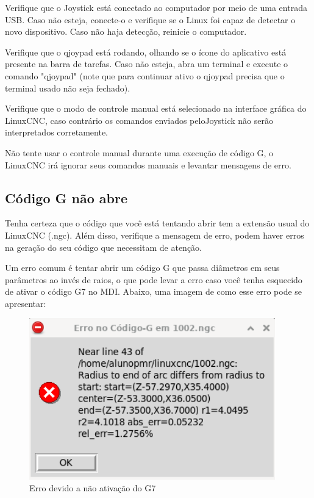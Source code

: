 \documentclass[twoside,a4paper]{refart}
\begin{document}
Verifique que o Joystick está conectado ao computador por meio de uma entrada USB. Caso não esteja, conecte-o e verifique se o Linux foi capaz de detectar o novo dispositivo. Caso não haja detecção, reinicie o computador. 

Verifique que o qjoypad está rodando, olhando se o ícone do aplicativo está presente na barra de tarefas. Caso não esteja, abra um terminal e execute o comando "qjoypad" (note que para continuar ativo o qjoypad precisa que o terminal usado não seja fechado).

Verifique que o modo de controle manual está selecionado na interface gráfica do LinuxCNC, caso contrário os comandos enviados peloJoystick não serão interpretados corretamente.

\attention Não tente usar o controle manual durante uma execução de código G, o LinuxCNC irá ignorar seus comandos manuais e levantar mensagens de erro.

\subsection{Código G não abre}

Tenha certeza que o código que você está tentando abrir tem a extensão usual do LinuxCNC (.ngc). Além disso, verifique a mensagem de erro, podem haver erros na geração do seu código que necessitam de atenção.

Um erro comum é tentar abrir um código G que passa diâmetros em seus parâmetros ao invés de raios, o que pode levar a erro caso você tenha esquecido de ativar o código G7 no MDI. Abaixo, uma imagem de como esse erro pode se apresentar:

\begin{figure}
    \begin{center}
        \includegraphics[width=0.95\textwidth]{imagens/erro_g7.png}
    \end{center}
    \caption{Erro devido a não ativação do G7}\label{errog7}
\end{figure}
\end{document}
